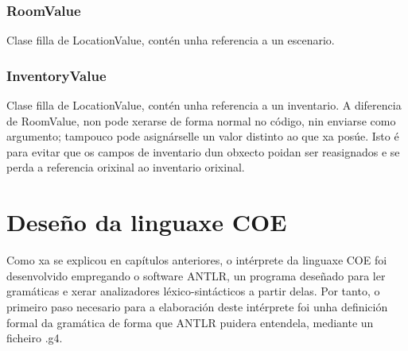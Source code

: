 \subsubsection{RoomValue}
Clase filla de LocationValue, contén unha referencia a un escenario.
\subsubsection{InventoryValue}
Clase filla de LocationValue, contén unha referencia a un inventario. A
diferencia de RoomValue, non pode xerarse de forma normal no código, nin
enviarse como argumento; tampouco pode asignárselle un valor distinto ao que xa
posúe. Isto é para evitar que os campos de inventario dun obxecto poidan ser
reasignados e se perda a referencia orixinal ao inventario orixinal. 


\section{Deseño da linguaxe COE}
Como xa se explicou en capítulos anteriores, o intérprete da linguaxe COE foi
desenvolvido empregando o software ANTLR, un programa deseñado para ler
gramáticas e xerar analizadores léxico-sintácticos a partir delas. Por tanto, o
primeiro paso necesario para a elaboración deste intérprete foi unha definición
formal da gramática de forma que ANTLR puidera entendela, mediante un ficheiro
.g4.


